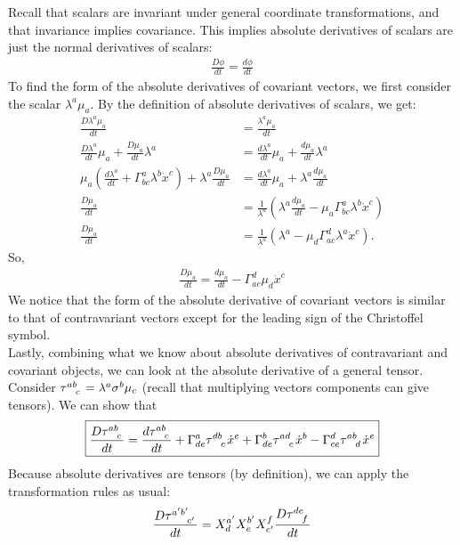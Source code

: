 \documentclass{book}
\theoremstyle{definition}
\begin{document}
Recall that scalars are invariant under general coordinate transformations, and that invariance implies covariance. This implies absolute derivatives of scalars are just the normal derivatives of scalars:
\begin{align*}
\boxed{\frac{D\phi}{dt} = \frac{d\phi}{dt}}
\end{align*}
To find the form of the absolute derivatives of covariant vectors, we first consider the scalar $\lambda^a\mu_a$. By the definition of absolute derivatives of scalars, we get:
\begin{align*}
\frac{D\lambda^a\mu_a}{dt} &= \frac{\lambda^a\mu_a}{dt}\\
\frac{D\lambda^a}{dt}\mu_a + \frac{D\mu_a}{dt}\lambda^a &= \frac{d\lambda^a}{dt}\mu_a + \frac{d\mu_a}{dt}\lambda^a\\
\mu_a\left( \frac{d\lambda^a}{dt}+\Gamma^a_{bc}\lambda^b\dot{x}^c\right)
+ \lambda^a\frac{D\mu_a}{dt} &= \frac{d\lambda^a}{dt}\mu_a + \lambda^a\frac{d\mu_a}{dt}\\
\frac{D\mu_a}{dt} &= \frac{1}{\lambda^a}\left(\lambda^a\frac{d\mu_a}{dt} - \mu_a\Gamma^a_{bc}\lambda^b\dot{x}^c \right)\\
\frac{D\mu_a}{dt} &= \frac{1}{\lambda^a}\left( \lambda^a - \mu_d\Gamma^d_{ac}\lambda^a\dot{x}^c\right).  
\end{align*}
So,
\begin{align}
\boxed{\frac{D\mu_a}{dt} = \frac{d\mu_a}{dt} - \Gamma^d_{ac}\mu_d\dot{x}^c}
\end{align}
We notice that the form of the absolute derivative of covariant vectors is similar to that of contravariant vectors except for the leading sign of the Christoffel symbol.\\

Lastly, combining what we know about absolute derivatives of contravariant and covariant objects,  we can look at the absolute derivative of a general tensor. Consider $\tensor{\tau}{^{ab}_{c}} = \lambda^a\sigma^b\mu_c$ (recall that multiplying vectors components can give tensors). We can show that
\begin{align*}
\boxed{\frac{D\tensor{\tau}{^{ab}_c}}{dt} = \frac{d\tensor{\tau}{^{ab}_{c}}}{dt} + \Gamma^{a}_{de}\tensor{\tau}{^{db}_{c}}\dot{x}^e + \Gamma^{b}_{de}\tensor{\tau}{^{ad}_{c}}\dot{x}^b - \Gamma^d_{ce}\tensor{\tau}{^{ab}_{d}}\dot{x}^e}
\end{align*} 
Because absolute derivatives are tensors (by definition), we can apply the transformation rules as usual:
\begin{align*}
\frac{D\tensor{\tau}{^{a'b'}_{c'}}}{dt} = X^{a'}_{d}X^{b'}_{e}X^{f}_{c'}\frac{D\tensor{\tau}{^{de}_{f}}}{dt}
\end{align*}
\end{document}

